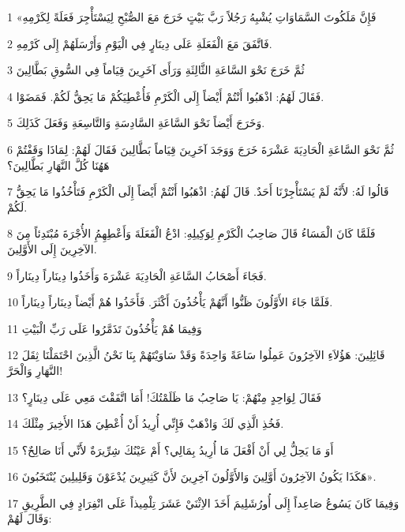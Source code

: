 \par 1 «فَإِنَّ مَلَكُوتَ السَّمَاوَاتِ يُشْبِهُ رَجُلاً رَبَّ بَيْتٍ خَرَجَ مَعَ الصُّبْحِ لِيَسْتَأْجِرَ فَعَلَةً لِكَرْمِهِ
\par 2 فَاتَّفَقَ مَعَ الْفَعَلَةِ عَلَى دِينَارٍ فِي الْيَوْمِ وَأَرْسَلَهُمْ إِلَى كَرْمِهِ.
\par 3 ثُمَّ خَرَجَ نَحْوَ السَّاعَةِ الثَّالِثَةِ وَرَأَى آخَرِينَ قِيَاماً فِي السُّوقِ بَطَّالِينَ
\par 4 فَقَالَ لَهُمُ: اذْهَبُوا أَنْتُمْ أَيْضاً إِلَى الْكَرْمِ فَأُعْطِيَكُمْ مَا يَحِقُّ لَكُمْ. فَمَضَوْا.
\par 5 وَخَرَجَ أَيْضاً نَحْوَ السَّاعَةِ السَّادِسَةِ وَالتَّاسِعَةِ وَفَعَلَ كَذَلِكَ.
\par 6 ثُمَّ نَحْوَ السَّاعَةِ الْحَادِيَةَ عَشْرَةَ خَرَجَ وَوَجَدَ آخَرِينَ قِيَاماً بَطَّالِينَ فَقَالَ لَهُمْ: لِمَاذَا وَقَفْتُمْ هَهُنَا كُلَّ النَّهَارِ بَطَّالِينَ؟
\par 7 قَالُوا لَهُ: لأَنَّهُ لَمْ يَسْتَأْجِرْنَا أَحَدٌ. قَالَ لَهُمُ: اذْهَبُوا أَنْتُمْ أَيْضاً إِلَى الْكَرْمِ فَتَأْخُذُوا مَا يَحِقُّ لَكُمْ.
\par 8 فَلَمَّا كَانَ الْمَسَاءُ قَالَ صَاحِبُ الْكَرْمِ لِوَكِيلِهِ: ادْعُ الْفَعَلَةَ وَأَعْطِهِمُِ الأُجْرَةَ مُبْتَدِئاً مِنَ الآخِرِينَ إِلَى الأَوَّلِينَ.
\par 9 فَجَاءَ أَصْحَابُ السَّاعَةِ الْحَادِيَةَ عَشْرَةَ وَأَخَذُوا دِينَاراً دِينَاراً.
\par 10 فَلَمَّا جَاءَ الأَوَّلُونَ ظَنُّوا أَنَّهُمْ يَأْخُذُونَ أَكْثَرَ. فَأَخَذُوا هُمْ أَيْضاً دِينَاراً دِينَاراً.
\par 11 وَفِيمَا هُمْ يَأْخُذُونَ تَذَمَّرُوا عَلَى رَبِّ الْبَيْتِ
\par 12 قَائِلِينَ: هَؤُلاَءِ الآخِرُونَ عَمِلُوا سَاعَةً وَاحِدَةً وَقَدْ سَاوَيْتَهُمْ بِنَا نَحْنُ الَّذِينَ احْتَمَلْنَا ثِقَلَ النَّهَارِ وَالْحَرَّ!
\par 13 فَقَالَ لِوَاحِدٍ مِنْهُمْ: يَا صَاحِبُ مَا ظَلَمْتُكَ! أَمَا اتَّفَقْتَ مَعِي عَلَى دِينَارٍ؟
\par 14 فَخُذِ الَّذِي لَكَ وَاذْهَبْ فَإِنِّي أُرِيدُ أَنْ أُعْطِيَ هَذَا الأَخِيرَ مِثْلَكَ.
\par 15 أَوَ مَا يَحِلُّ لِي أَنْ أَفْعَلَ مَا أُرِيدُ بِمَالِي؟ أَمْ عَيْنُكَ شِرِّيرَةٌ لأَنِّي أَنَا صَالِحٌ؟
\par 16 هَكَذَا يَكُونُ الآخِرُونَ أَوَّلِينَ وَالأَوَّلُونَ آخِرِينَ لأَنَّ كَثِيرِينَ يُدْعَوْنَ وَقَلِيلِينَ يُنْتَخَبُونَ».
\par 17 وَفِيمَا كَانَ يَسُوعُ صَاعِداً إِلَى أُورُشَلِيمَ أَخَذَ الاِثْنَيْ عَشَرَ تِلْمِيذاً عَلَى انْفِرَادٍ فِي الطَّرِيقِ وَقَالَ لَهُمْ:
